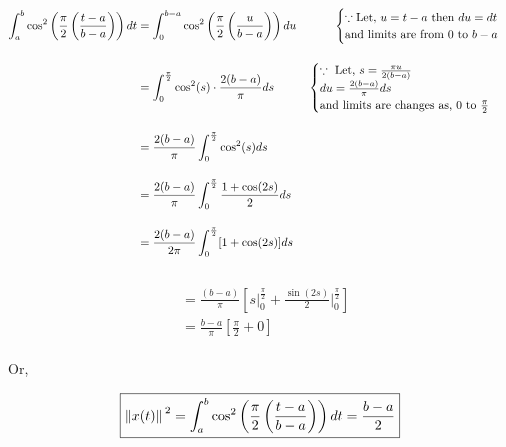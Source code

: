 \documentclass[12pt, a4paper]{article} %
\begin{document}
    \begin{equation*}
        \begin{split}
            \int_{a}^{b} \cos^2\left(\frac{\pi}{2}\left(\frac{t-a}{b-a}\right)\right) dt & = \int_{0}^{b-a} \cos^2\left(\frac{\pi}{2}\left(\frac{u}{b-a}\right)\right) du \hspace*{1cm} \ \begin{cases}
               \because \mbox{Let,}\ u = t-a\  \mbox{then}\ du = dt\\
               \mbox{and limits are from}\ 0 \ \mbox{to}\ b-a
            \end{cases}\\[4mm]
            & = \int_{0}^{\frac{\pi}{2}} \cos^2(s)\cdot \frac{2(b-a)}{\pi} ds \hspace*{1cm} 
                \begin{cases}
                    \because\ \mbox{Let,}\ s = \frac{\pi u}{2(b-a)}\\
                    du = \frac{2(b-a)}{\pi} ds\\
                    \mbox{and limits are changes as,}\ 0\  \mbox{to}\ \frac{\pi}{2} 
                \end{cases}\\[4mm]
                & = \frac{2(b-a)}{\pi} \int_{0}^{\frac{\pi}{2}} \cos^2(s) ds\\[4mm]
                & = \frac{2(b-a)}{\pi} \int_{0}^{\frac{\pi}{2}} \frac{1+\cos(2s)}{2} ds\\[4mm]
                & = \frac{2(b-a)}{2 \pi} \int_{0}^{\frac{\pi}{2}} [1+ \cos(2s)] ds\\[4mm]
        \end{split}
    \end{equation*}

    \begin{equation*}
        \begin{split}
            & = \frac{(b-a)}{\pi}\left[s\bigg|_{0}^{\frac{\pi}{2}} + \frac{\sin(2s)}{2}\bigg|_{0}^{\frac{\pi}{2}}\right]\\[4mm]
            & = \frac{b-a}{\pi}\left[\frac{\pi}{2} + 0\right]\\[4mm]
        \end{split}
    \end{equation*}

    Or, 

    \begin{align*}
        \boxed{\norm*{x(t)}^2 = \int_{a}^{b} \cos^2\left(\frac{\pi}{2}\left(\frac{t-a}{b-a}\right)\right) dt  = \frac{b-a}{2}}
    \end{align*}
\end{document}
